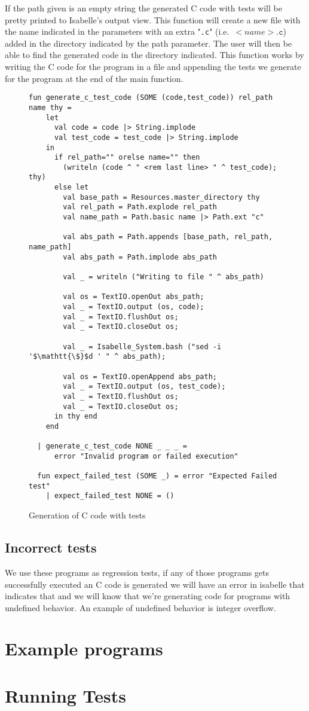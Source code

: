 If the path given is an empty string the generated C code with tests will be pretty printed to Isabelle's output view.
This function will create a new file with the name indicated in the parameters with an extra "\verb|.c|" (i.e.\ $<name>\mathtt{.c}$) added in the directory indicated by the path parameter.
The user will then be able to find the generated code in the directory indicated.
This function works by writing the C code for the program in a file and appending the tests we generate for the program at the end of the main function.

\begin{figure}
\begin{lstlisting}[mathescape=true]
  fun generate_c_test_code (SOME (code,test_code)) rel_path name thy =
    let
      val code = code |> String.implode
      val test_code = test_code |> String.implode
    in
      if rel_path="" orelse name="" then
        (writeln (code ^ " <rem last line> " ^ test_code); thy)
      else let
        val base_path = Resources.master_directory thy
        val rel_path = Path.explode rel_path
        val name_path = Path.basic name |> Path.ext "c"

        val abs_path = Path.appends [base_path, rel_path, name_path]
        val abs_path = Path.implode abs_path

        val _ = writeln ("Writing to file " ^ abs_path)

        val os = TextIO.openOut abs_path;
        val _ = TextIO.output (os, code);
        val _ = TextIO.flushOut os;
        val _ = TextIO.closeOut os;

        val _ = Isabelle_System.bash ("sed -i '$\mathtt{\$}$d ' " ^ abs_path);

        val os = TextIO.openAppend abs_path;
        val _ = TextIO.output (os, test_code);
        val _ = TextIO.flushOut os;
        val _ = TextIO.closeOut os;
      in thy end
    end

  | generate_c_test_code NONE _ _ _ =
      error "Invalid program or failed execution"

  fun expect_failed_test (SOME _) = error "Expected Failed test"
    | expect_failed_test NONE = ()
\end{lstlisting}

\caption{Generation of C code with tests}
\label{fig:generate_c_test_code}
\end{figure}


\subsection{Incorrect tests}
We use these programs as regression tests, if any of those programs gets successfully executed an C code is generated we will have an error in isabelle that indicates that and we will know that we're generating code for programs with undefined behavior.
An example of undefined behavior is integer overflow.

\section{Example programs}

\section{Running Tests}
